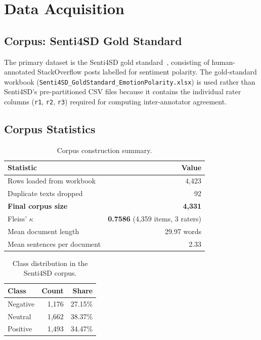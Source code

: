 \documentclass[11pt,a4paper]{article}
\begin{document}
\section{Data Acquisition}
\label{sec:acquisition}

\subsection{Corpus: Senti4SD Gold Standard}

The primary dataset is the Senti4SD gold standard~\cite{calefato2018sentiment}, consisting of human-annotated StackOverflow posts labelled for sentiment polarity. The gold-standard workbook (\texttt{Senti4SD\_\allowbreak GoldStandard\_\allowbreak EmotionPolarity.xlsx}) is used rather than Senti4SD's pre-partitioned CSV files because it contains the individual rater columns (\texttt{r1}, \texttt{r2}, \texttt{r3}) required for computing inter-annotator agreement.

\subsection{Corpus Statistics}

\begin{table}[H]
\centering
\caption{Corpus construction summary.}
\label{tab:corpus}
\begin{tabular}{lr}
\toprule
\textbf{Statistic} & \textbf{Value} \\
\midrule
Rows loaded from workbook & 4,423 \\
Duplicate texts dropped & 92 \\
\textbf{Final corpus size} & \textbf{4,331} \\
Fleiss' $\kappa$ & \textbf{0.7586} (4,359 items, 3 raters) \\
Mean document length & 29.97 words \\
Mean sentences per document & 2.33 \\
\bottomrule
\end{tabular}
\end{table}

\begin{table}[H]
\centering
\caption{Class distribution in the Senti4SD corpus.}
\label{tab:classdist}
\begin{tabular}{lrr}
\toprule
\textbf{Class} & \textbf{Count} & \textbf{Share} \\
\midrule
Negative & 1,176 & 27.15\% \\
Neutral  & 1,662 & 38.37\% \\
Positive & 1,493 & 34.47\% \\
\bottomrule
\end{tabular}
\end{table}
\end{document}
